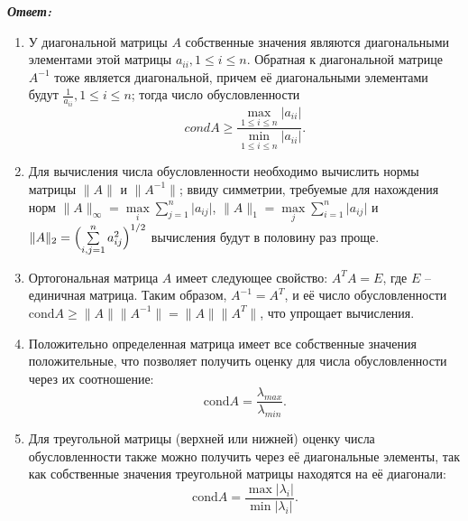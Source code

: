 \documentclass[12pt, a4paper]{article}
\newcommand{\norm}[1]{\lVert #1 \rVert}
\newcommand{\abs}[1]{\lvert #1 \rvert}
\begin{document}
\begin{enumerate}
		\vspace*{0.2cm}
		\textit{\textbf{Ответ:}}
		
		\begin{enumerate}
			\item У диагональной матрицы $A$ собственные значения являются диагональными элементами этой матрицы $a_{ii}, 1 \leq i \leq n$. Обратная к диагональной матрице $A^{-1}$ тоже является диагональной, причем её диагональными элементами будут $\frac{1}{a_{ii}}, 1 \leq i \leq n$; тогда число обусловленности 
			\begin{equation*}
				cond A \geq \frac{ \max\limits_{1 \leq i \leq n} \lvert a_{ii}\rvert }{\min\limits_{1 \leq i \leq n} \lvert a_{ii} \rvert}.
			\end{equation*}
			
			\item Для вычисления числа обусловленности необходимо вычислить нормы матрицы $\lVert {A} \rVert$ и $\lVert A^{-1} \rVert$; ввиду симметрии, требуемые для нахождения норм $\norm{A}_{\infty} = \max\limits_i \sum\limits_{j=1}^n \abs{a_{ij}}$, $\norm{A}_1 = \max\limits_j \sum\limits_{i=1}^n \abs{a_{ij}}$ и $ \norm{A}_2 = \Bigl ( \sum\limits_{i,j=1}^{n} a_{ij}^2 \Bigr)^{1/2}$ вычисления будут в половину раз проще.
			
			\item Ортогональная матрица $A$ имеет следующее свойство: $A^T A= E$, где $E$ -- единичная матрица. Таким образом, $A^{-1} = A^T$, и её число обусловленности $\text{cond} A \geq \norm{A} \norm{A^{-1}} = \norm{A} \norm{A^{T}}$, что упрощает вычисления.
			
			\item Положительно определенная матрица имеет все собственные значения положительные, что позволяет получить оценку для числа обусловленности через их соотношение:
			\begin{equation*}
				\text{cond} A = \frac{\lambda_{max}}{\lambda_{min}}.
			\end{equation*}
			
			\item Для треугольной матрицы (верхней или нижней) оценку числа обусловленности также можно получить через её диагональные элементы, так как собственные значения треугольной матрицы находятся на её диагонали:
			\begin{equation*}
				\text{cond} A = \frac{\max {\abs{\lambda_i}}}{ \min \abs{{\lambda_i}} }.
			\end{equation*}
			
			
		\end{enumerate}
		

\end{enumerate}
\end{document}
